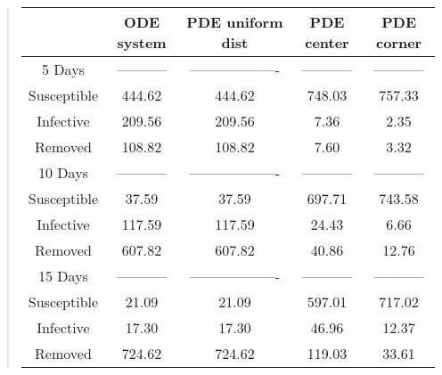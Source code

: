 \documentclass[%
twoside,                 %
final,                   %
chapterprefix=true,      %
open=right               %
10pt]{book}
\begin{document}
\begin{quote}
\begin{tabular}{ccccc}
\hline
\multicolumn{1}{c}{  } & \multicolumn{1}{c}{ ODE system } & \multicolumn{1}{c}{ PDE uniform dist } & \multicolumn{1}{c}{ PDE center } & \multicolumn{1}{c}{ PDE corner } \\
\hline
5 Days      & ----------- & ------------------- & ----------- & ----------- \\
\hline
Susceptible & 444.62      & 444.62              & 748.03      & 757.33      \\
Infective   & 209.56      & 209.56              & 7.36        & 2.35        \\
Removed     & 108.82      & 108.82              & 7.60        & 3.32        \\
\hline
10 Days     & ----------- & ------------------- & ----------- & ----------- \\
\hline
Susceptible & 37.59       & 37.59               & 697.71      & 743.58      \\
Infective   & 117.59      & 117.59              & 24.43       & 6.66        \\
Removed     & 607.82      & 607.82              & 40.86       & 12.76       \\
\hline
15 Days     & ----------- & ------------------- & ----------- & ----------- \\
\hline
Susceptible & 21.09       & 21.09               & 597.01      & 717.02      \\
Infective   & 17.30       & 17.30               & 46.96       & 12.37       \\
Removed     & 724.62      & 724.62              & 119.03      & 33.61       \\
\hline
\end{tabular}
\end{quote}

\noindent
\end{document}
